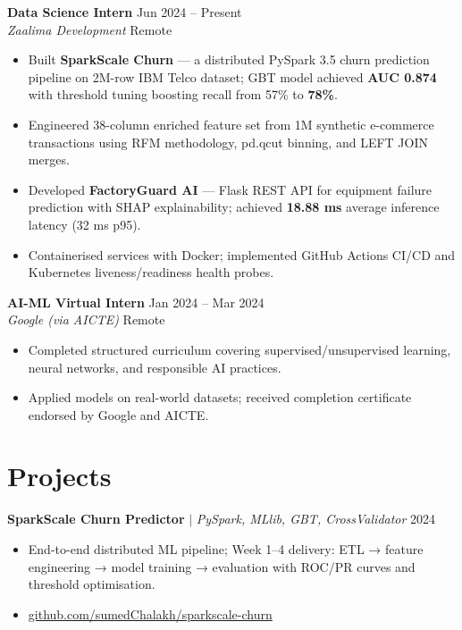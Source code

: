 \documentclass[10pt, letterpaper]{article}
\newcommand{\entry}[4]{%
  \noindent\textbf{#1} \hfill {\small\color{muted}#3}\\
  \textit{\color{muted}#2} \hfill {\small\color{muted}#4}
  \vspace{2pt}%
}
\newcommand{\project}[3]{%
  \noindent\textbf{#1} $\vert$ {\small\textit{#2}} \hfill {\small\color{muted}#3}
  \vspace{2pt}%
}
\begin{document}
\entry{Data Science Intern}{Zaalima Development}{Jun 2024 -- Present}{Remote}
\begin{itemize}
  \item Built \textbf{SparkScale Churn} — a distributed PySpark 3.5 churn prediction
        pipeline on 2M-row IBM Telco dataset; GBT model achieved \textbf{AUC 0.874}
        with threshold tuning boosting recall from 57\% to \textbf{78\%}.
  \item Engineered 38-column enriched feature set from 1M synthetic e-commerce
        transactions using RFM methodology, pd.qcut binning, and LEFT JOIN merges.
  \item Developed \textbf{FactoryGuard AI} — Flask REST API for equipment failure
        prediction with SHAP explainability; achieved \textbf{18.88 ms} average
        inference latency (32 ms p95).
  \item Containerised services with Docker; implemented GitHub Actions CI/CD and
        Kubernetes liveness/readiness health probes.
\end{itemize}

\vspace{6pt}
\entry{AI-ML Virtual Intern}{Google (via AICTE)}{Jan 2024 -- Mar 2024}{Remote}
\begin{itemize}
  \item Completed structured curriculum covering supervised/unsupervised learning,
        neural networks, and responsible AI practices.
  \item Applied models on real-world datasets; received completion certificate
        endorsed by Google and AICTE.
\end{itemize}

\section{Projects}

\project{SparkScale Churn Predictor}{PySpark, MLlib, GBT, CrossValidator}{2024}
\begin{itemize}
  \item End-to-end distributed ML pipeline; Week 1–4 delivery: ETL → feature
        engineering → model training → evaluation with ROC/PR curves and
        threshold optimisation.
  \item \href{https://github.com/sumedChalakh/sparkscale-churn}{github.com/sumedChalakh/sparkscale-churn}
\end{itemize}
\end{document}
